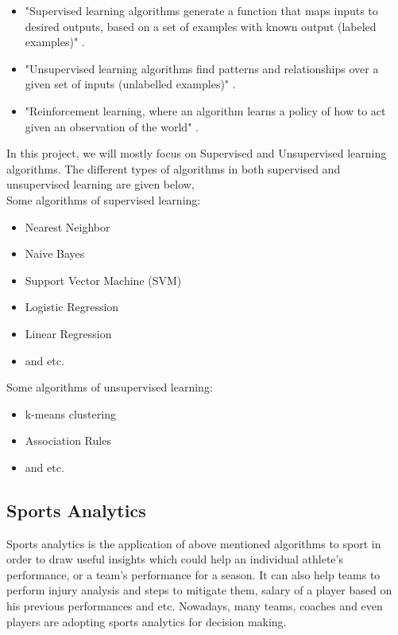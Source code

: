 \documentclass[format=sigconf]{acmart}
\begin{document}
\begin{itemize}
    \item "Supervised learning algorithms generate a function that maps inputs to desired outputs, based
    on a set of examples with known output (labeled examples)" \cite{tzanis2009machine}.
    \item "Unsupervised learning algorithms find patterns and relationships over a given set of inputs 
    (unlabelled examples)" \cite{tzanis2009machine}.
    \item "Reinforcement learning, where an algorithm learns a policy of how to act given an observation of the world" \cite{tzanis2009machine}.
\end{itemize}
In this project, we will mostly focus on Supervised and Unsupervised learning algorithms. The different types of algorithms in both
supervised and unsupervised learning are given below, \\

Some algorithms of supervised learning:
\begin{itemize}
    \item Nearest Neighbor
    \item Naive Bayes
    \item Support Vector Machine (SVM)
    \item Logistic Regression
    \item Linear Regression
    \item and etc.
\end{itemize}
\par
Some algorithms of unsupervised learning:
\begin{itemize}
    \item k-means clustering
    \item Association Rules \cite{typeofml}
    \item and etc.
\end{itemize}
\subsection{Sports Analytics}
Sports analytics is the application of above mentioned algorithms to sport in order to draw useful insights which could help 
an individual athlete's performance, or a team's performance for a season. It can also help teams to perform injury analysis
and steps to mitigate them, salary of a player based on his previous performances and etc. Nowadays,  many teams, coaches and 
even players are adopting sports analytics for decision making.
\end{document}
